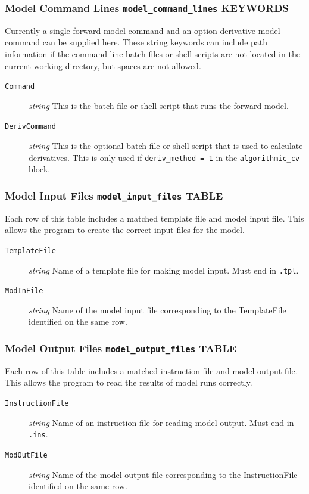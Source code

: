 \documentclass[11pt,oneside,onecolumn]{usgsreport}
\begin{document}
\begin{appendix}
\subsubsection{Model Command Lines \texttt{model\_command\_lines} KEYWORDS}

Currently a single forward model command and an option derivative
model command can be supplied here. These string keywords can include
path information if the command line batch files or shell scripts
are not located in the current working directory, but spaces are not
allowed.
\begin{description}
\item [{\texttt{Command}}] \emph{string} This is the batch file or shell
script that runs the forward model.
\item [{\texttt{DerivCommand}}] \emph{string} This is the optional batch
file or shell script that is used to calculate derivatives. This is
only used if \texttt{deriv\_method = 1} in the \texttt{algorithmic\_cv}
block.
\end{description}

\subsubsection{Model Input Files \texttt{model\_input\_files} TABLE}

Each row of this table includes a matched template file and model
input file. This allows the program to create the correct input files
for the model.
\begin{description}
\item [{\texttt{TemplateFile}}] \emph{string} Name of a template file for
making model input. Must end in \texttt{.tpl}.
\item [{\texttt{ModInFile}}] \emph{string} Name of the model input file
corresponding to the TemplateFile identified on the same row.
\end{description}

\subsubsection{Model Output Files \texttt{model\_output\_files} TABLE}

Each row of this table includes a matched instruction file and model
output file. This allows the program to read the results of model
runs correctly.
\begin{description}
\item [{\texttt{InstructionFile}}] \emph{string} Name of an instruction
file for reading model output. Must end in \texttt{.ins}.
\item [{\texttt{ModOutFile}}] \emph{string} Name of the model output file
corresponding to the InstructionFile identified on the same row.
\end{description}


\end{appendix}
\end{document}
